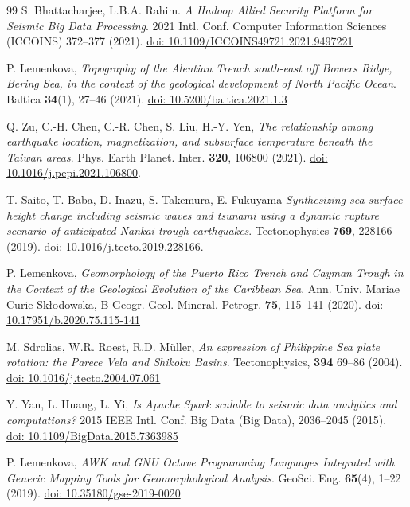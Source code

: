 \documentclass{rrparticle}
\begin{document}
\begin{thebibliography}{99}
 S. Bhattacharjee, L.B.A. Rahim. \emph{A Hadoop Allied Security Platform for Seismic Big Data Processing}. 2021 Intl. Conf. Computer Information Sciences (ICCOINS) 372--377 (2021).  \href{https://doi.org/10.1109/ICCOINS49721.2021.9497221}{doi: 10.1109/ICCOINS49721.2021.9497221}

P. Lemenkova, \emph{Topography of the Aleutian Trench south-east off Bowers Ridge, Bering Sea, in the context of the geological development of North Pacific Ocean}. Baltica \textbf{34}(1), 27--46 (2021). \href{https://doi.org/10.5200/baltica.2021.1.3}{doi: 10.5200/baltica.2021.1.3}

 Q. Zu, C.-H. Chen, C.-R. Chen, S. Liu, H.-Y. Yen, \emph{The relationship among earthquake location, magnetization, and subsurface temperature beneath the Taiwan areas}. Phys. Earth Planet. Inter. \textbf{320}, 106800 (2021). \href{https://doi.org/10.1016/j.pepi.2021.106800}{doi: 10.1016/j.pepi.2021.106800}.

 T. Saito, T. Baba, D. Inazu, S. Takemura, E. Fukuyama \emph{Synthesizing sea surface height change including seismic waves and tsunami using a dynamic rupture scenario of anticipated Nankai trough earthquakes}. Tectonophysics \textbf{769}, 228166 (2019). \href{https://doi.org/10.1016/j.tecto.2019.228166}{doi: 10.1016/j.tecto.2019.228166}.

P. Lemenkova, \emph{Geomorphology of the Puerto Rico Trench and Cayman Trough in the Context of the Geological Evolution of the Caribbean Sea}. Ann. Univ. Mariae Curie-Skłodowska, B Geogr. Geol. Mineral. Petrogr. \textbf{75}, 115--141 (2020). \href{https://doi.org/10.17951/b.2020.75.115-141}{doi: 10.17951/b.2020.75.115-141}

 M. Sdrolias, W.R. Roest, R.D. Müller, \emph{An expression of Philippine Sea plate rotation: the Parece Vela and Shikoku Basins}. Tectonophysics, \textbf{394} 69--86 (2004). \href{https://doi.org/10.1016/j.tecto.2004.07.061}{doi: 10.1016/j.tecto.2004.07.061}

 Y. Yan, L. Huang, L. Yi,  \emph{Is Apache Spark scalable to seismic data analytics and computations?} 2015 IEEE Intl. Conf. Big Data (Big Data), 2036--2045 (2015).  \href{https://doi.org/10.1109/BigData.2015.7363985}{doi: 10.1109/BigData.2015.7363985}

P. Lemenkova, \emph{AWK and GNU Octave Programming Languages Integrated with Generic Mapping Tools for Geomorphological Analysis}. GeoSci. Eng. \textbf{65}(4), 1--22 (2019). \href{https://doi.org/10.35180/gse-2019-0020}{doi: 10.35180/gse-2019-0020}


\end{thebibliography}
\end{document}
